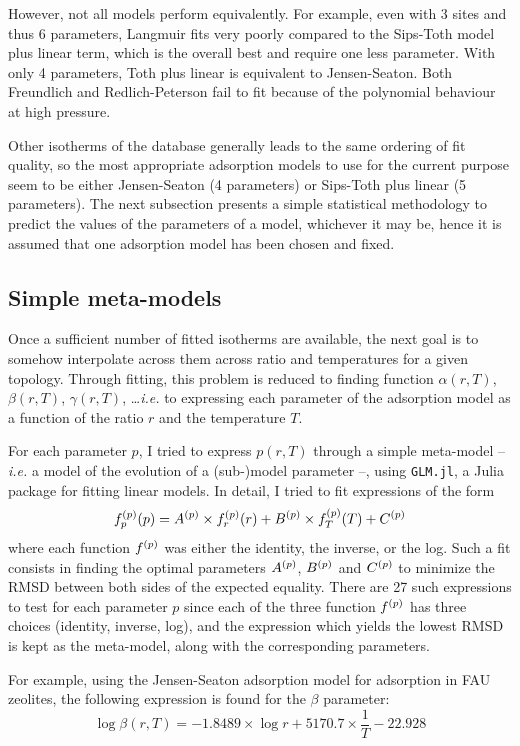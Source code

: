 \documentclass[main.tex]{subfiles}
\begin{document}
However, not all models perform equivalently. For example, even with 3 sites and thus 6 parameters, Langmuir fits very poorly compared to the Sips-Toth model plus linear term, which is the overall best and require one less parameter. With only 4 parameters, Toth plus linear is equivalent to Jensen-Seaton. Both Freundlich and Redlich-Peterson fail to fit because of the polynomial behaviour at high pressure. 

Other isotherms of the database generally leads to the same ordering of fit quality, so the most appropriate adsorption models to use for the current purpose seem to be either Jensen-Seaton (4 parameters) or Sips-Toth plus linear (5 parameters). The next subsection presents a simple statistical methodology to predict the values of the parameters of a model, whichever it may be, hence it is assumed that one adsorption model has been chosen and fixed.

\subsection{Simple meta-models}

Once a sufficient number of fitted isotherms are available, the next goal is to somehow interpolate across them across \SiAl ratio and temperatures for a given topology. Through fitting, this problem is reduced to finding function $\alpha(r, T)$, $\beta(r, T)$, $\gamma(r, T)$, \ldots \textit{i.e.} to expressing each parameter of the adsorption model as a function of the \SiAl ratio $r$ and the temperature $T$.

For each parameter $p$, I tried to express $p(r, T)$ through a simple meta-model -- \textit{i.e.} a model of the evolution of a (sub-)model parameter --, using \texttt{GLM.jl}, a Julia package for fitting linear models. In detail, I tried to fit expressions of the form
\[f^{\left(p\right)}_p(p) = A^{\left(p\right)}\times f^{\left(p\right)}_r(r) + B^{\left(p\right)}\times f^{\left(p\right)}_T(T) + C^{\left(p\right)}\]
where each function $f^{\left(p\right)}$ was either the identity, the inverse, or the log. Such a fit consists in finding the optimal parameters $A^{\left(p\right)}$, $B^{\left(p\right)}$ and $C^{\left(p\right)}$ to minimize the RMSD between both sides of the expected equality. There are 27 such expressions to test for each parameter $p$ since each of the three function $f^{\left(p\right)}$ has three choices (identity, inverse, log), and the expression which yields the lowest RMSD is kept as the meta-model, along with the corresponding parameters.

For example, using the Jensen-Seaton adsorption model for  adsorption in FAU zeolites, the following expression is found for the $\beta$ parameter:
\[\log \beta(r, T) = - 1.8489\times\log r + 5170.7\times\frac1T -22.928 \label{eq:beta_fit_JS}\]
\end{document}
